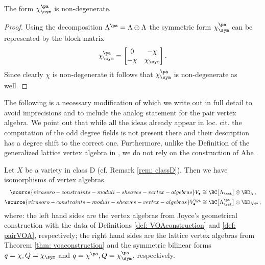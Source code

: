 \begin{lemma}
\notready
\label{Lem: nondegenerate}
The form $\chi^{\pa}_{\sym}$ is non-degenerate.
\end{lemma}
\begin{proof}
Using the decomposition $\Lambda^{\pa}=\Lambda\oplus \Lambda$ the symmetric form $\chi^{\pa}_{\sym}$ can be represented by the block matrix
\[\chi^{\pa}_{\sym}=\begin{bmatrix}
0&-\chi\\
-\chi& \chi_\sym
\end{bmatrix}.\]
Since clearly $\chi$ is non-degenerate it follows that $\chi^{\pa}_{\sym}$ is non-degenerate as well.
\end{proof}



The following is a necessary modification of \cite[Theorem 5.7]{Gr19} which we write out in full detail to avoid imprecisions and to include the analog statement for the pair vertex algebra. We point out that while all the ideas already appear in loc. cit. the computation of the odd degree fields is not present there and their description has a degree shift to the correct one. Furthermore, unlike the Definition of the generalized lattice vertex algebra in \cite{Gr19}, we do not rely on the construction of Abe \cite{Abe07}.

\begin{theorem}
\notready\label{thm: gross}
Let $X$ be a variety in class D (cf. Remark \ref{rem: classD}).
Then we have isomorphisms of vertex algebras
\begin{align}
\label{Eq: sheafVOA}
\source{virasoro-constraints-moduli-sheaves-vertex-algebras}
V_\bullet &\cong \BC\big[\Lambda_\sst\big]\otimes \BD_{\Lambda}\,,\\
\label{Eq: pairVOA}
\source{virasoro-constraints-moduli-sheaves-vertex-algebras}
V^{\pa}_\bullet &\cong \BC\big[\Lambda^{\pa}_{\sst}\big]\otimes \BD_{\Lambda^{\pa}}\,,
\end{align}
where: the left hand sides are the vertex algebras from Joyce's geometrical construction with the data of Definitions \ref{def: VOAconstruction} and \ref{def: pairVOA}, respectively; the right hand sides are the lattice vertex algebras from Theorem \ref{thm: voaconstruction} and the symmetric bilinear forms $q=\chi, Q=\chi_\sym$ and $q=\chi^{\pa}, Q=\chi_\sym^{\pa}$, respectively.
\end{theorem}



